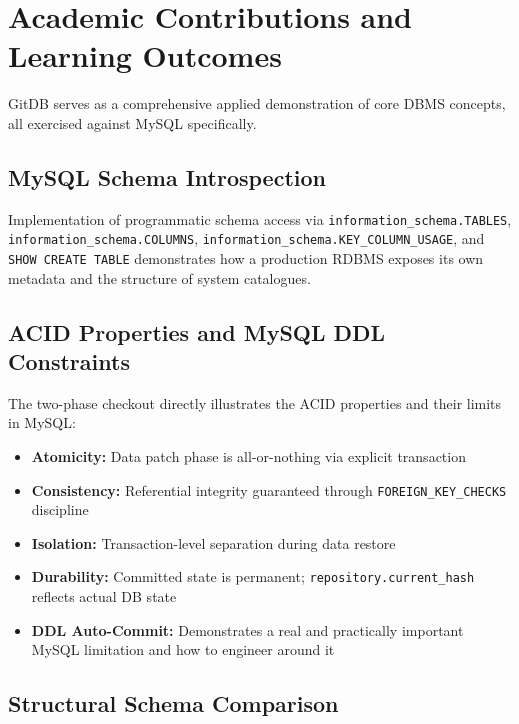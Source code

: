 \documentclass[12pt, a4paper]{article}
\begin{document}
\section{Academic Contributions and Learning Outcomes}

GitDB serves as a comprehensive applied demonstration of core DBMS concepts, all
exercised against MySQL specifically.

\subsection{MySQL Schema Introspection}

Implementation of programmatic schema access via \texttt{information\_schema.TABLES},
\texttt{information\_schema.COLUMNS}, \texttt{information\_schema.KEY\_COLUMN\_USAGE},
and \texttt{SHOW CREATE TABLE} demonstrates how a production RDBMS exposes its
own metadata and the structure of system catalogues.

\subsection{ACID Properties and MySQL DDL Constraints}

The two-phase checkout directly illustrates the ACID properties and their limits
in MySQL:

\begin{itemize}[leftmargin=1.5em, itemsep=0.3em]
    \item \textbf{Atomicity:} Data patch phase is all-or-nothing via explicit
    transaction
    \item \textbf{Consistency:} Referential integrity guaranteed through
    \texttt{FOREIGN\_KEY\_CHECKS} discipline
    \item \textbf{Isolation:} Transaction-level separation during data restore
    \item \textbf{Durability:} Committed state is permanent;
    \texttt{repository.current\_hash} reflects actual DB state
    \item \textbf{DDL Auto-Commit:} Demonstrates a real and practically
    important MySQL limitation and how to engineer around it
\end{itemize}

\subsection{Structural Schema Comparison}
\end{document}

